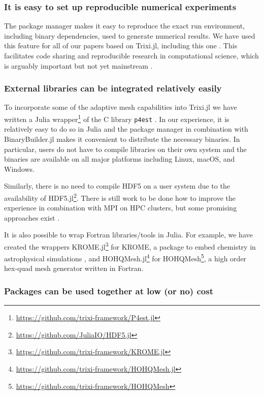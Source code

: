 \documentclass{juliacon}
\newcommand{\trixi}{Trixi.jl\xspace}
\begin{document}
\subsubsection{It is easy to set up reproducible numerical experiments}

The package manager makes it easy to reproduce the exact run environment, including
binary dependencies, used to generate numerical results. We have used this feature for all of our papers based on
\trixi \cite{schlottkelakemper2021purely, ranocha2021preventing}, including this
one \cite{ranocha2021adaptiveRepro}.
This facilitates code sharing and reproducible research in computational science,
which is arguably important but not yet mainstream \cite{barnes2010publish,
donoho2010invitation, leveque2013top}.

\subsubsection{External libraries can be integrated relatively easily}

To incorporate some of the adaptive mesh capabilities into \trixi
we have written a Julia wrapper\footnote{\url{https://github.com/trixi-framework/P4est.jl}}
of the C library \texttt{p4est} \cite{burstedde2011p4est}. In our experience,
it is relatively easy to do so in Julia and the package manager in combination
with BinaryBuilder.jl makes it convenient to distribute the necessary binaries.
In particular, users do not have to compile libraries on their own system
and the binaries are available on all major platforms including Linux, macOS,
and Windows.

Similarly, there is no need to compile HDF5 on a user system due to the
availability of HDF5.jl\footnote{\url{https://github.com/JuliaIO/HDF5.jl}}.
There is still work to be done how to improve the experience in combination
with MPI on HPC clusters, but some promising
approaches exist \cite{byrne2021mpi}.

It is also possible to wrap Fortran libraries/tools in Julia. For example, we
have created the wrappers KROME.jl\footnote{\url{https://github.com/trixi-framework/KROME.jl}}
for KROME, a package to embed chemistry in astrophysical simulations
\cite{grassi2014krome}, and HOHQMesh.jl\footnote{\url{https://github.com/trixi-framework/HOHQMesh.jl}}
for HOHQMesh\footnote{\url{https://github.com/trixi-framework/HOHQMesh}}, a high order
hex-quad mesh generator written in Fortran.

\subsubsection{Packages can be used together at low (or no) cost}
\end{document}
